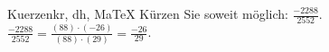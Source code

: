 \begin{MAufgabe}{Kuerzen}{kr, dh, MaTeX}
K\"urzen Sie soweit m\"oglich: $\frac{-2288}{2552}$.\\ 
\ifLsg\MLoesung
\quad $\frac{-2288}{2552}=\frac{(88)\cdot(-26)}{(88)\cdot(29)}=\frac{-26}{29}$.\else\relax\fi
 \end{MAufgabe}